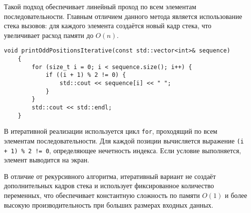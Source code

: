 Такой подход обеспечивает линейный проход по всем элементам последовательности.  
Главным отличием данного метода является использование стека вызовов: для каждого элемента создаётся новый кадр стека, что увеличивает расход памяти до $O(n)$.  

\begin{lstlisting}[label=lst_iterative_algo, caption=Реализация итеративного алгоритма вывода элементов последовательности с нечетными номерами]
	void printOddPositionsIterative(const std::vector<int>& sequence)
	{
		for (size_t i = 0; i < sequence.size(); i++) {
			if ((i + 1) % 2 != 0) {
				std::cout << sequence[i] << " ";
			}
		}
		std::cout << std::endl;
	}
\end{lstlisting}

В итеративной реализации используется цикл \texttt{for}, проходящий по всем элементам последовательности.
Для каждой позиции вычисляется выражение \texttt{(i + 1) \% 2 != 0}, определяющее нечетность индекса.
Если условие выполняется, элемент выводится на экран.

В отличие от рекурсивного алгоритма, итеративный вариант не создаёт дополнительных кадров стека и использует
фиксированное количество переменных, что обеспечивает константную сложность по памяти $O(1)$
и более высокую производительность при больших размерах входных данных.


